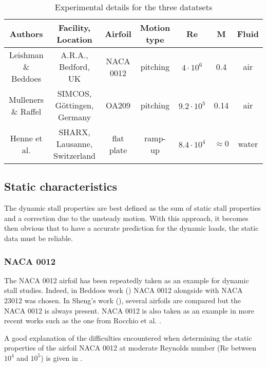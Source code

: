 \begin{table}
	\centering
	\begin{tabular}{|c|c|c|c|c|c|c|}
		\hline
		Authors & Facility, Location & Airfoil & Motion type & Re & M& Fluid \\
		\hline
		Leishman \& Beddoes & A.R.A., Bedford, UK & NACA 0012 & pitching & $4\cdot10^6$ & 0.4 & air \\
		Mulleners \& Raffel & SIMCOS, Göttingen, Germany & OA209 & pitching & $9.2 \cdot 10^5$ & 0.14 & air \\
		Henne et al. & SHARX, Lausanne, Switzerland & flat plate & ramp-up & $8.4 \cdot 10^4$ & $\approx 0$ & water \\
		\hline
	\end{tabular}
	\caption{Experimental details for the three datatsets}
	\label{table:exp_details}
\end{table}

\subsection{Static characteristics}

The dynamic stall properties are best defined as the sum of static stall properties and a correction due to the unsteady motion. With this approach, it becomes then obvious that to have a accurate prediction for the dynamic loads, the static data must be reliable. 

\subsubsection{NACA 0012}

The NACA 0012 airfoil has been repeatedly taken as an example for dynamic stall studies. Indeed, in Beddoes work (\cite{beddoes_representation_1983,leishman_semi-empirical_1989}) NACA 0012 alongside with NACA 23012 was chosen. In Sheng's work (\cite{sheng_new_2006,sheng_improved_2007}), several airfoils are compared but the NACA 0012 is always present. NACA 0012 is also taken as an example in more recent works such as the one from Rocchio et al. \cite{rocchio_simple_2020}.

A good explanation of the difficulties encountered when determining the static properties of the airfoil NACA 0012 at moderate Reynolds number (Re between $10^4$ and $10^5$) is given in \cite{tank_possibility_2017}.

\iffalse
\begin{figure}[h]
    \centering
    \texttt{[image: static\_naca0012.png]}
    \caption{Normal coefficient curve for airfoil NACA 0012, in steady-state from angles of attack from $\alpha=-5 \deg$ to $17 \deg$}
    \label{fig:static_flatplate}
\end{figure}
\fi


